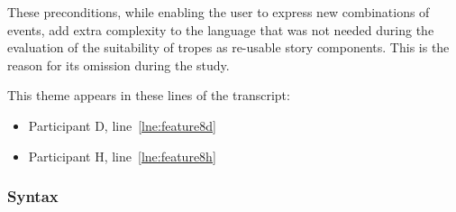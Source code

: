\documentclass[11pt]{report}
\newcommand{\lref}[1]{\hyperlink{llineno:#1}{\ref*{#1}}}
\begin{document}
\begin{itemize}
These preconditions, while enabling the user to express new combinations of
events, add extra complexity to the language that was not needed during the
evaluation of the suitability of tropes as re-usable story components. This is
the reason for its omission during the study.

This theme appears in these lines of the transcript:

\begin{itemize}
\item Participant D, line~\lref{lne:feature8d}
\item Participant H, line~\lref{lne:feature8h}
\end{itemize}
\end{itemize}

\subsubsection{Syntax}
\end{document}
